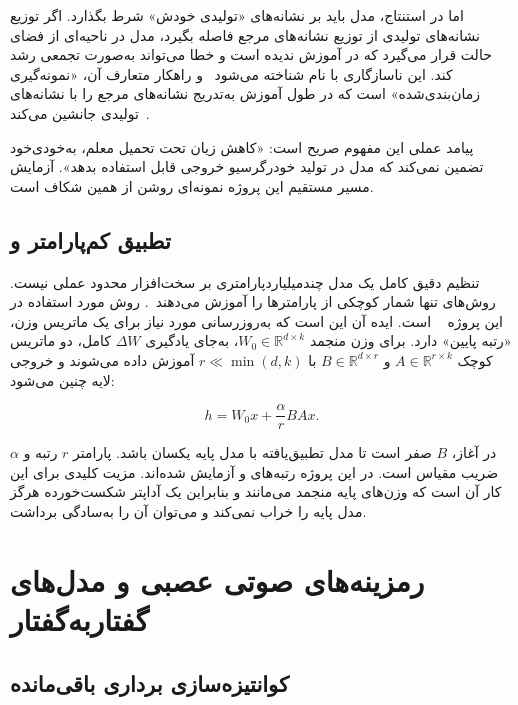 اما در استنتاج، مدل باید بر نشانه‌های «تولیدی خودش» شرط بگذارد. اگر
توزیع نشانه‌های تولیدی از توزیع نشانه‌های مرجع فاصله بگیرد، مدل در ناحیه‌ای
از فضای حالت قرار می‌گیرد که در آموزش ندیده است و خطا می‌تواند به‌صورت
تجمعی رشد کند. این ناسازگاری با نام
 شناخته
می‌شود~\cite{ranzato2016scheduledsampling} و راهکار متعارف آن،
«نمونه‌گیری زمان‌بندی‌شده» است که در طول آموزش به‌تدریج نشانه‌های مرجع را
با نشانه‌های تولیدی جانشین می‌کند~\cite{bengio2015scheduledsampling}.

پیامد عملی این مفهوم صریح است: «کاهش زیان تحت تحمیل معلم، به‌خودی‌خود
تضمین نمی‌کند که مدل در تولید خودرگرسیو خروجی قابل استفاده بدهد». آزمایش
مسیر مستقیم این پروژه نمونه‌ای روشن از همین شکاف است.

\subsection{تطبیق کم‌پارامتر و }

تنظیم دقیق کامل یک مدل چند‌میلیارد‌پارامتری بر سخت‌افزار محدود عملی نیست.
روش‌های  تنها شمار کوچکی از پارامترها را آموزش
می‌دهند~\cite{houlsby2019adapters,li2021prefixtuning}. روش مورد استفاده در
این پروژه ~\cite{hu2022lora} است. ایده آن این است که به‌روزرسانی
مورد نیاز برای یک ماتریس وزن، «رتبه پایین» دارد. برای وزن منجمد
$W_0 \in \mathbb{R}^{d \times k}$، به‌جای یادگیری $\Delta W$ کامل، دو ماتریس
کوچک $A \in \mathbb{R}^{r \times k}$ و $B \in \mathbb{R}^{d \times r}$ با
$r \ll \min(d,k)$ آموزش داده می‌شوند و خروجی لایه چنین می‌شود:

\begin{equation}
h = W_0 x + \frac{\alpha}{r} B A x .
\label{eq:lora}
\end{equation}

در آغاز، $B$ صفر است تا مدل تطبیق‌یافته با مدل پایه یکسان باشد. پارامتر
$r$ رتبه و $\alpha$ ضریب مقیاس است. در این پروژه رتبه‌های  و 
آزمایش شده‌اند. مزیت کلیدی  برای این کار آن است که وزن‌های پایه
منجمد می‌مانند و بنابراین یک آداپتر شکست‌خورده هرگز مدل پایه را خراب
نمی‌کند و می‌توان آن را به‌سادگی برداشت.

\section{رمزینه‌های صوتی عصبی و مدل‌های گفتار‌به‌گفتار}
\label{sec:codec}

\subsection{کوانتیزه‌سازی برداری باقی‌مانده}

